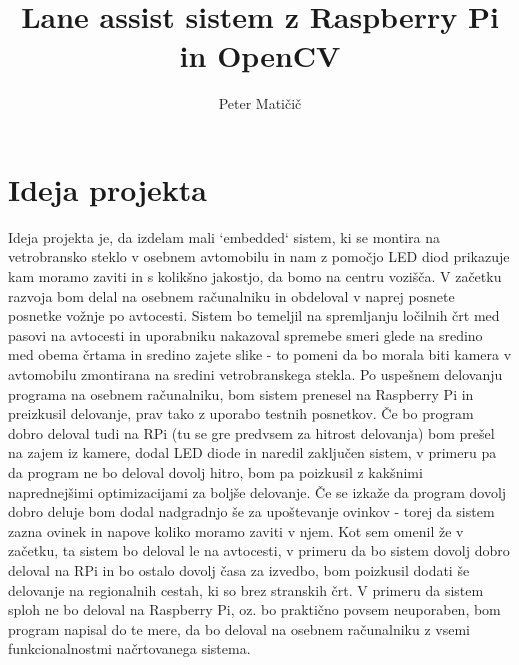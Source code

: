 \documentclass[A4]{article}
\begin{document}
 
 \title{Lane assist sistem z Raspberry Pi in OpenCV}
 \author{Peter Matičič}
 \maketitle

 \section{Ideja projekta}
 Ideja projekta je, da izdelam mali `embedded` sistem, ki se montira na vetrobransko steklo v osebnem avtomobilu in nam z pomočjo LED diod prikazuje kam moramo zaviti in s kolikšno jakostjo, da bomo na centru vozišča. V začetku razvoja bom delal na osebnem računalniku in obdeloval v naprej posnete posnetke vožnje po avtocesti. Sistem bo temeljil na spremljanju ločilnih črt med pasovi na avtocesti in uporabniku nakazoval spremebe smeri glede na sredino med obema črtama in sredino zajete slike - to pomeni da bo morala biti kamera v avtomobilu zmontirana na sredini vetrobranskega stekla. Po uspešnem delovanju programa na osebnem računalniku, bom sistem prenesel na Raspberry Pi in preizkusil delovanje, prav tako z uporabo testnih posnetkov. Če bo program dobro deloval tudi na RPi (tu se gre predvsem za hitrost delovanja) bom prešel na zajem iz kamere, dodal LED diode in naredil zaključen sistem, v primeru pa da program ne bo deloval dovolj hitro, bom pa poizkusil z kakšnimi naprednejšimi optimizacijami za boljše delovanje. Če se izkaže da program dovolj dobro deluje bom dodal nadgradnjo še za upoštevanje ovinkov - torej da sistem zazna ovinek in napove koliko moramo zaviti v njem. Kot sem omenil že v začetku, ta sistem bo deloval le na avtocesti, v primeru da bo sistem dovolj dobro deloval na RPi in bo ostalo dovolj časa za izvedbo, bom poizkusil dodati še delovanje na regionalnih cestah, ki so brez stranskih črt. V primeru da sistem sploh ne bo deloval na Raspberry Pi, oz. bo praktično povsem neuporaben, bom program napisal do te mere, da bo deloval na osebnem računalniku z vsemi funkcionalnostmi načrtovanega sistema.
 
\end{document}
